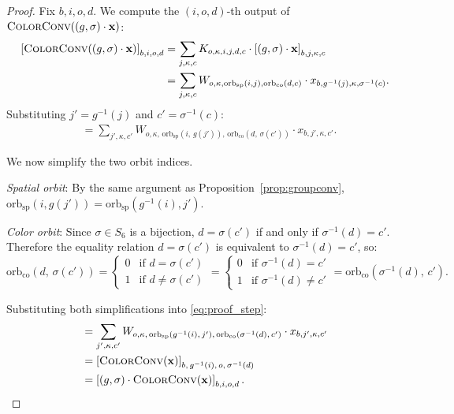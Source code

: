\documentclass[11pt]{article}
\newcommand{\bx}{\mathbf{x}}
\newcommand{\orbsp}{\mathrm{orb}_{\mathrm{sp}}}
\newcommand{\orbco}{\mathrm{orb}_{\mathrm{co}}}
\begin{document}
\begin{proof}
Fix $b, i, o, d$.
We compute the $(i, o, d)$-th output of
$\textsc{ColorConv}\!\left((g, \sigma) \cdot \bx\right)$:
\begin{align}
  \left[\textsc{ColorConv}\!\left((g,\sigma)\cdot\bx\right)\right]_{b,i,o,d}
  &= \sum_{j,\kappa,c} K_{o,\kappa,i,j,d,c}
     \cdot \left[(g,\sigma)\cdot\bx\right]_{b,j,\kappa,c} \notag \\
  &= \sum_{j,\kappa,c} W_{o,\kappa,\orbsp(i,j),\orbco(d,c)}
     \cdot x_{b,g^{-1}(j),\kappa,\sigma^{-1}(c)}.
\end{align}
Substituting $j' = g^{-1}(j)$ and $c' = \sigma^{-1}(c)$:
\begin{align}
  &= \sum_{j',\kappa,c'} W_{o,\kappa,\,\orbsp(i,\,g(j')),\,\orbco(d,\,\sigma(c'))}
     \cdot x_{b,j',\kappa,c'}.
  \label{eq:proof_step}
\end{align}

We now simplify the two orbit indices.

\emph{Spatial orbit}: By the same argument as Proposition~\ref{prop:groupconv},
$\orbsp(i, g(j')) = \orbsp(g^{-1}(i), j')$.

\emph{Color orbit}: Since $\sigma \in S_6$ is a bijection, $d = \sigma(c')$
if and only if $\sigma^{-1}(d) = c'$.
Therefore the equality relation $d = \sigma(c')$ is equivalent to
$\sigma^{-1}(d) = c'$, so:
\begin{equation}
  \orbco(d,\, \sigma(c')) =
  \begin{cases}
    0 & \text{if } d = \sigma(c') \\
    1 & \text{if } d \neq \sigma(c')
  \end{cases}
  =
  \begin{cases}
    0 & \text{if } \sigma^{-1}(d) = c' \\
    1 & \text{if } \sigma^{-1}(d) \neq c'
  \end{cases}
  = \orbco(\sigma^{-1}(d),\, c').
  \label{eq:color_orbit_inv}
\end{equation}

Substituting both simplifications into \eqref{eq:proof_step}:
\begin{align}
  &= \sum_{j',\kappa,c'} W_{o,\kappa,\,\orbsp(g^{-1}(i),\,j'),\,\orbco(\sigma^{-1}(d),\,c')}
     \cdot x_{b,j',\kappa,c'} \notag \\
  &= \left[\textsc{ColorConv}(\bx)\right]_{b,\,g^{-1}(i),\,o,\,\sigma^{-1}(d)} \notag \\
  &= \left[(g,\sigma)\cdot\textsc{ColorConv}(\bx)\right]_{b,i,o,d}. \qedhere
\end{align}
\end{proof}
\end{document}
